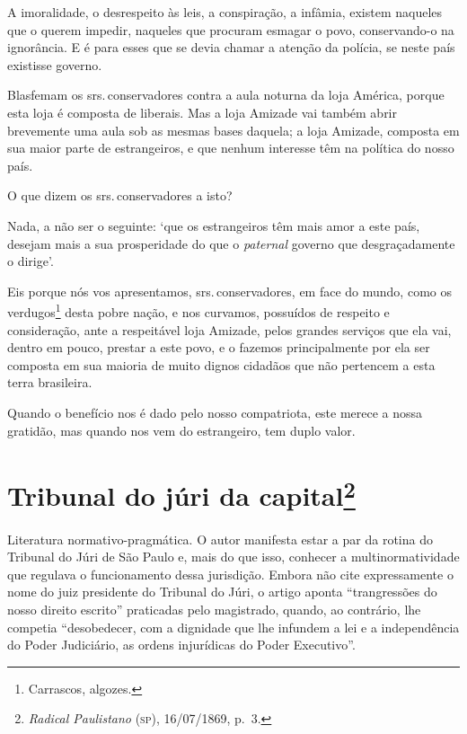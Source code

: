 A imoralidade, o desrespeito às leis, a conspiração, a infâmia, existem
naqueles que o querem impedir, naqueles que procuram esmagar o povo,
conservando-o na ignorância. E é para esses que se devia chamar a
atenção da polícia, se neste país existisse governo.

Blasfemam os srs.\,conservadores contra a aula noturna da loja América,
porque esta loja é composta de liberais. Mas a loja Amizade vai também
abrir brevemente uma aula sob as mesmas bases daquela; a loja Amizade,
composta em sua maior parte de estrangeiros, e que nenhum interesse têm
na política do nosso país.

O que dizem os srs.\,conservadores a isto?

Nada, a não ser o seguinte: `que os estrangeiros têm mais amor a este
país, desejam mais a sua prosperidade do que o \emph{paternal} governo
que desgraçadamente o dirige'.

Eis porque nós vos apresentamos, srs.\,conservadores, em face do mundo,
como os verdugos\footnote{Carrascos, algozes.} desta pobre nação, e
nos curvamos, possuídos de respeito e consideração, ante a respeitável
loja Amizade, pelos grandes serviços que ela vai, dentro em pouco,
prestar a este povo, e o fazemos principalmente por ela ser composta em
sua maioria de muito dignos cidadãos que não pertencem a esta terra
brasileira.

Quando o benefício nos é dado pelo nosso compatriota, este merece a
nossa gratidão, mas quando nos vem do estrangeiro, tem duplo valor.

\chapter{Tribunal do júri da capital\footnote{\emph{Radical Paulistano}
  (\textsc{sp}), 16/07/1869, p.~3.}}

\begin{didascalia}
Literatura normativo-pragmática. O autor manifesta estar a par da rotina
do Tribunal do Júri de São Paulo e, mais do que isso, conhecer a
multinormatividade que regulava o funcionamento dessa jurisdição. Embora
não cite expressamente o nome do juiz presidente do Tribunal do Júri, o
artigo aponta ``trangressões do nosso direito escrito'' praticadas pelo
magistrado, quando, ao contrário, lhe competia ``desobedecer, com a
dignidade que lhe infundem a lei e a independência do Poder Judiciário,
as ordens injurídicas do Poder Executivo''.
\end{didascalia}



